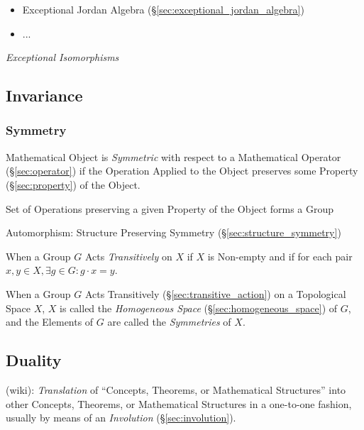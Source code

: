 \begin{itemize}
  \item Exceptional Jordan Algebra (\S\ref{sec:exceptional_jordan_algebra})
  \item ...
\end{itemize}

\emph{Exceptional Isomorphisms}



\subsection{Invariance}\label{sec:invariance}

\subsubsection{Symmetry}\label{sec:symmetry}

Mathematical Object is \emph{Symmetric} with respect to a Mathematical
Operator (\S\ref{sec:operator}) if the Operation Applied to the Object
preserves some Property (\S\ref{sec:property}) of the Object.

Set of Operations preserving a given Property of the Object forms a
Group %

Automorphism: Structure Preserving Symmetry
(\S\ref{sec:structure_symmetry})

When a Group $G$ Acts \emph{Transitively} on $X$ if $X$ is Non-empty and if for
each pair $x,y \in X, \exists g \in G : g \cdot x = y$.

When a Group $G$ Acts Transitively (\S\ref{sec:transitive_action}) on a
Topological Space $X$, $X$ is called the \emph{Homogeneous Space}
(\S\ref{sec:homogeneous_space}) of $G$, and the Elements of $G$ are called the
\emph{Symmetries} of $X$.



\subsection{Duality}\label{sec:duality}

(wiki): \emph{Translation} of ``Concepts, Theorems, or Mathematical
Structures'' into other Concepts, Theorems, or Mathematical Structures in a
one-to-one fashion, usually by means of an \emph{Involution}
(\S\ref{sec:involution}).

